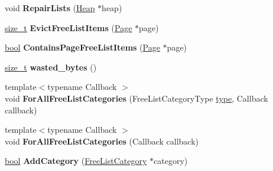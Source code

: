 \begin{DoxyCompactItemize}
\mbox{\label{classv8_1_1internal_1_1FreeList_aeeb8bd0cb83326e7985985b468597d14}} 
void {\bfseries Repair\+Lists} (\mbox{\hyperlink{classv8_1_1internal_1_1Heap}{Heap}} $\ast$heap)
\item 
\mbox{\label{classv8_1_1internal_1_1FreeList_af041d94e7e27581a5ffb7055a0af864b}} 
\mbox{\hyperlink{classsize__t}{size\+\_\+t}} {\bfseries Evict\+Free\+List\+Items} (\mbox{\hyperlink{classv8_1_1internal_1_1Page}{Page}} $\ast$page)
\item 
\mbox{\label{classv8_1_1internal_1_1FreeList_a79583a8994240cfcbe9b62633fd974c6}} 
\mbox{\hyperlink{classbool}{bool}} {\bfseries Contains\+Page\+Free\+List\+Items} (\mbox{\hyperlink{classv8_1_1internal_1_1Page}{Page}} $\ast$page)
\item 
\mbox{\label{classv8_1_1internal_1_1FreeList_acbcb42c967055ca5c0c12282eaa9aabb}} 
\mbox{\hyperlink{classsize__t}{size\+\_\+t}} {\bfseries wasted\+\_\+bytes} ()
\item 
\mbox{\label{classv8_1_1internal_1_1FreeList_a874575254a8775cea516360ac77fa79f}} 
{\footnotesize template$<$typename Callback $>$ }\\void {\bfseries For\+All\+Free\+List\+Categories} (Free\+List\+Category\+Type \mbox{\hyperlink{classstd_1_1conditional_1_1type}{type}}, Callback callback)
\item 
\mbox{\label{classv8_1_1internal_1_1FreeList_a3f8c32e83ac1e62650e96615d3a85e49}} 
{\footnotesize template$<$typename Callback $>$ }\\void {\bfseries For\+All\+Free\+List\+Categories} (Callback callback)
\item 
\mbox{\label{classv8_1_1internal_1_1FreeList_a5e449f34c8035d4f353c10cb8bfc6272}} 
\mbox{\hyperlink{classbool}{bool}} {\bfseries Add\+Category} (\mbox{\hyperlink{classv8_1_1internal_1_1FreeListCategory}{Free\+List\+Category}} $\ast$category)
\item 
\mbox{\label{classv8_1_1internal_1_1FreeList_ae9eb2b754f476bc5b138d7b5e9407550}} 

\end{DoxyCompactItemize}
